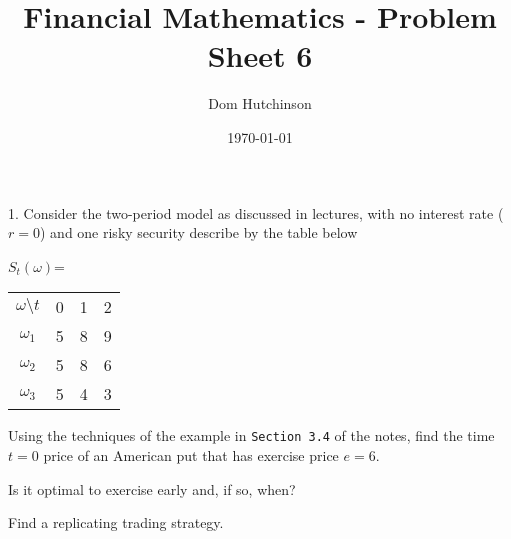 \documentclass[11pt,a4paper]{article}
\begin{document}
\questionsfalse

\title{Financial Mathematics - Problem Sheet 6}
\author{Dom Hutchinson}
\date{\today}
\maketitle

\begin{question}{1.}
  Consider the two-period model as discussed in lectures, with no interest rate ($r=0$) and one risky security describe by the table below
  \begin{center}
    $S_t(\omega)$=
    \begin{tabular}{c|ccc}
      $\omega\setminus t$&0&1&2\\
      $\omega_1$&5&8&9\\
      $\omega_2$&5&8&6\\
      $\omega_3$&5&4&3
    \end{tabular}
  \end{center}
  Using the techniques of the example in \texttt{Section 3.4} of the notes, find the time $t=0$ price of an American put that has exercise price $e=6$.
  \par Is it optimal to exercise early and, if so, when?
  \par Find a replicating trading strategy.
\end{question}
\end{document}
